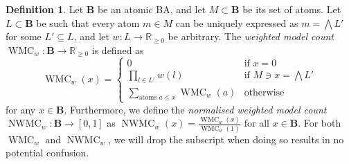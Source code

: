 \documentclass{article}
\theoremstyle{definition}
\newtheorem{definition}{Definition}
\theoremstyle{remark}
\DeclareMathOperator{\WMC}{WMC}
\DeclareMathOperator{\nWMC}{NWMC}
\begin{document}
\begin{definition} \label{def:wmc}
  Let $\mathbf{B}$ be an atomic BA, and let $M \subset \mathbf{B}$ be its set of
  atoms. Let $L \subset \mathbf{B}$ be such that every atom $m \in M$ can be
  uniquely expressed as $m = \bigwedge L'$ for some $L' \subseteq L$, and let
  $w\colon L \to \mathbb{R}_{\ge 0}$ be arbitrary. The \emph{weighted model
    count} $\WMC_w\colon \mathbf{B} \to \mathbb{R}_{\ge 0}$ is defined as
  \[
    \WMC_w(x) = \begin{cases}
      0 & \text{if } x = 0 \\
      \prod_{l \in L'} w(l) & \text{if } M \ni x = \bigwedge L' \\
      \sum_{\text{atoms } a \le x} \WMC_w(a) & \text{otherwise}
    \end{cases}
  \]
  for any $x \in \mathbf{B}$. Furthermore, we define the \emph{normalised
    weighted model count} $\nWMC_w\colon \mathbf{B} \to [0, 1]$ as $\nWMC_w(x) =
  \frac{\WMC_w(x)}{\WMC_w(1)}$ for all $x \in \mathbf{B}$. For both $\WMC_w$ and
  $\nWMC_w$, we will drop the subscript when doing so results in no potential
  confusion.
\end{definition}
\end{document}
